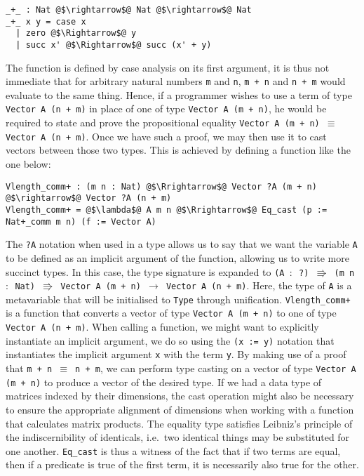 \documentclass[12pt,twoside,maitrise]{dms}
\theoremstyle{definition}
\numberwithin{equation}{section}
\numberwithin{table}{chapter}
\numberwithin{figure}{chapter}
\newcommand\id[1] {\texttt{#1}}
\newcommand\fn[1] {\texttt{#1}}
\begin{document}
\begin{verbatim}
_+_ : Nat @$\rightarrow$@ Nat @$\rightarrow$@ Nat
_+_ x y = case x
  | zero @$\Rightarrow$@ y
  | succ x' @$\Rightarrow$@ succ (x' + y)
\end{verbatim}

The function is defined by case analysis on its first argument, it is thus not
immediate that for arbitrary natural numbers \fn{m} and \fn{n}, \fn{m + n} and
\fn{n + m} would evaluate to the same thing. Hence, if a programmer wishes to
use a term of type \fn{Vector A (n + m)} in place of one of type \fn{Vector A
  (m + n)}, he would be required to state and prove the propositional equality
\fn{Vector A (m + n) $\equiv$ Vector A (n + m)}. Once we have such a proof, we
may then use it to cast vectors between those two types. This is achieved by
defining a function like the one below:

\begin{verbatim}
Vlength_comm+ : (m n : Nat) @$\Rrightarrow$@ Vector ?A (m + n) @$\rightarrow$@ Vector ?A (n + m)
Vlength_comm+ = @$\lambda$@ A m n @$\Rrightarrow$@ Eq_cast (p := Nat+_comm m n) (f := Vector A)
\end{verbatim}

The \id{?A} notation when used in a type allows us to say that we want the
variable \id{A} to be defined as an implicit argument of the function, allowing
us to write more succinct types. In this case, the type signature is expanded to
\fn{(A $\colon$ ?) $\Rrightarrow$ (m n $\colon$ Nat) $\Rrightarrow$ Vector A (m
  + n) $\rightarrow$ Vector A (n + m)}. Here, the type of \id{A} is a
metavariable that will be initialised to \id{Type} through unification.
\fn{Vlength\_comm+} is a function that converts a vector of type \fn{Vector A (m
  + n)} to one of type \fn{Vector A (n + m)}. When calling a function, we might
want to explicitly instantiate an implicit argument, we do so using the \fn{(x
  := y)} notation that instantiates the implicit argument \id{x} with the term
\id{y}. By making use of a proof that \fn{m + n $\equiv$ n + m}, we can perform
type casting on a vector of type \fn{Vector A (m + n)} to produce a vector of
the desired type. If we had a data type of matrices indexed by their dimensions,
the cast operation might also be necessary to ensure the appropriate alignment
of dimensions when working with a function that calculates matrix products. The
equality type satisfies Leibniz's principle of the indiscernibility of
identicals, i.e.\ two identical things may be substituted for one another.
\fn{Eq\_cast} is thus a witness of the fact that if two terms are equal, then if
a predicate is true of the first term, it is necessarily also true for the
other.
\end{document}
